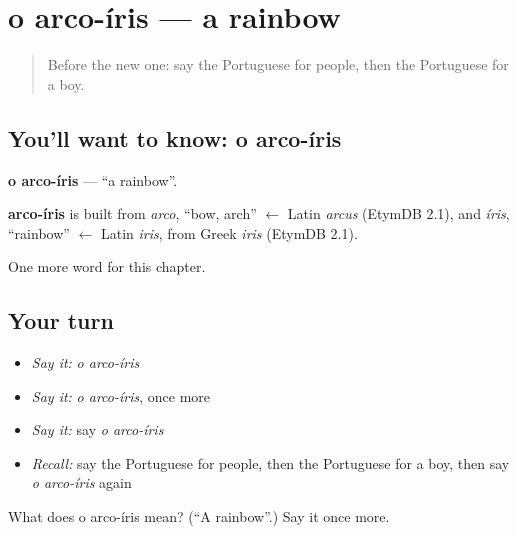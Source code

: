 \section[o arco-íris]{o arco-íris — a rainbow}

\label{lesson:PT-C102-arco-iris}



\begin{quote}
Before the new one: say the Portuguese for people, then the Portuguese for a boy.
\end{quote}

\subsection*{You'll want to know: o arco-íris}
\textbf{o arco-íris} — \textquotedblleft{}a rainbow\textquotedblright{}.

\begin{cousinweb}
\textbf{arco-íris} is built from \emph{arco}, \textquotedblleft{}bow, arch\textquotedblright{} $\leftarrow$ Latin \emph{arcus} (EtymDB 2.1), and \emph{íris}, \textquotedblleft{}rainbow\textquotedblright{} $\leftarrow$ Latin \emph{iris}, from Greek \emph{iris} (EtymDB 2.1).
\end{cousinweb}

\begin{grammarlens}[title={What you've built}]
One more word for this chapter.
\end{grammarlens}

\subsection*{Your turn}
\begin{itemize}
\raggedright
  \item \emph{Say it:} \emph{o arco-íris}
  \item \emph{Say it:} \emph{o arco-íris}, once more
  \item \emph{Say it:} say \emph{o arco-íris}
  \item \emph{Recall:} say the Portuguese for people, then the Portuguese for a boy, then say \emph{o arco-íris} again
\end{itemize}

\begin{tcolorbox}[breakable,colback=teal!4,colframe=teal!35!black,title={Before you move on}]
What does o arco-íris mean? (\textquotedblleft{}A rainbow\textquotedblright{}.) Say it once more.
\end{tcolorbox}
